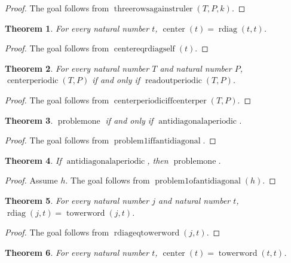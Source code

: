 \documentclass[11pt]{article}
\newtheorem{theorem}{Theorem}[section]
\theoremstyle{definition}
\begin{document}
\begin{proof}
The goal follows from \(\operatorname{threerowsagainstruler}(T, P, k)\).
\end{proof}
\begin{theorem}
\label{ll:observations:center-eq-rdiag-self}
For every natural number \(t\), \(\operatorname{center}(t) = \operatorname{rdiag}(t, t)\).
\end{theorem}
\begin{proof}
The goal follows from \(\operatorname{centereqrdiagself}(t)\).
\end{proof}
\begin{theorem}
\label{ll:observations:center-periodic-iff-center-per}
For every natural number \(T\) and natural number \(P\), \(\operatorname{centerperiodic}(T, P)\) if and only if \(\operatorname{readoutperiodic}(T, P)\).
\end{theorem}
\begin{proof}
The goal follows from \(\operatorname{centerperiodiciffcenterper}(T, P)\).
\end{proof}
\begin{theorem}
\label{ll:observations:problem1-iff-antidiagonal}
\(\operatorname{problemone}\) if and only if \(\operatorname{antidiagonalaperiodic}\).
\end{theorem}
\begin{proof}
The goal follows from \(\operatorname{problem1iffantidiagonal}\).
\end{proof}
\begin{theorem}
\label{ll:observations:problem1-of-antidiagonal}
If \(\operatorname{antidiagonalaperiodic}\), then \(\operatorname{problemone}\).
\end{theorem}
\begin{proof}
Assume \(h\).
The goal follows from \(\operatorname{problem1ofantidiagonal}(h)\).
\end{proof}
\begin{theorem}
\label{ll:observations:rdiag-eq-tower-word}
For every natural number \(j\) and natural number \(t\), \(\operatorname{rdiag}(j, t) = \operatorname{towerword}(j, t)\).
\end{theorem}
\begin{proof}
The goal follows from \(\operatorname{rdiageqtowerword}(j, t)\).
\end{proof}
\begin{theorem}
\label{ll:observations:center-eq-tower-word}
For every natural number \(t\), \(\operatorname{center}(t) = \operatorname{towerword}(t, t)\).
\end{theorem}
\end{document}
